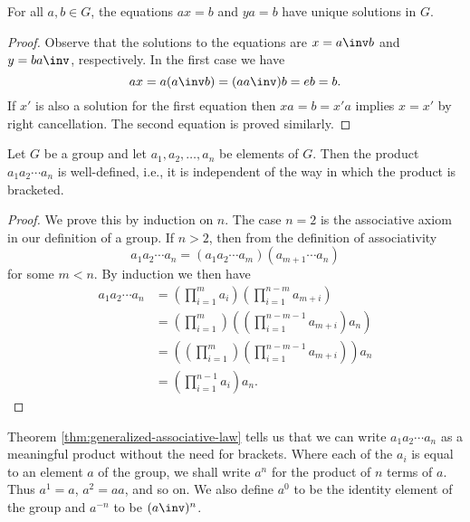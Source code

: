\begin{corollary}
    For all \(a, b \in G\), the equations \(ax = b\) and \(ya = b\) have unique
    solutions in \(G\).
\end{corollary}

\begin{proof}
    Observe that the solutions to the equations are \(x = a\inv b\) and \(y =
    ba\inv\), respectively. In the first case we have
    \[
        ax = a(a\inv b) = (aa\inv)b = eb = b.
    \]
    If \(x'\) is also a solution for the first equation then \(xa = b = x'a\)
    implies \(x = x'\) by right cancellation. The second equation is proved
    similarly.
\end{proof}

\begin{theorem}
    \label{thm:generalized-associative-law}
    Let \(G\) be a group and let \(a_1, a_2, \ldots, a_n\) be elements of \(G\).
    Then the product \(a_1 a_2 \cdots a_n\) is well-defined, i.e., it is
    independent of the way in which the product is bracketed.
\end{theorem}

\begin{proof}
    We prove this by induction on \(n\). The case \(n = 2\) is the associative
    axiom in our definition of a group. If \(n > 2\), then from the definition
    of associativity
    \[
        a_1 a_2 \cdots a_n = (a_1 a_2 \cdots a_m)(a_{m + 1} \cdots a_n)
    \]
    for some \(m < n\). By induction we then have
    \begin{align*}
        a_1 a_2 \cdots a_n & = \left(\prod_{i = 1}^m a_i\right)\left(\prod_{i = 1}^{n - m} a_{m + i}\right)\\
        & = \left(\prod_{i =1}^{m}\right)\left(\left(\prod_{i = 1}^{n - m - 1} a_{m + i}\right)a_n\right)\\
        & = \left(\left(\prod_{i = 1}^{m}\right)\left(\prod_{i = 1}^{n - m- 1} a_{m + i}\right)\right)a_n\\
        & = \left(\prod_{i = 1}^{n - 1} a_i\right)a_n.
    \end{align*}
\end{proof}

\begin{remark}
    Theorem \ref{thm:generalized-associative-law} tells us that we can write
    \(a_1 a_2 \cdots a_n\) as a meaningful product without the need for
    brackets. Where each of the \(a_i\) is equal to an element \(a\) of the
    group, we shall write \(a^n\) for the product of \(n\) terms of \(a\). Thus
    \(a^1 = a\), \(a^2 = aa\), and so on. We also define \(a^0\) to be the
    identity element of the group and \(a^{-n}\) to be \((a\inv)^n\).
\end{remark}

